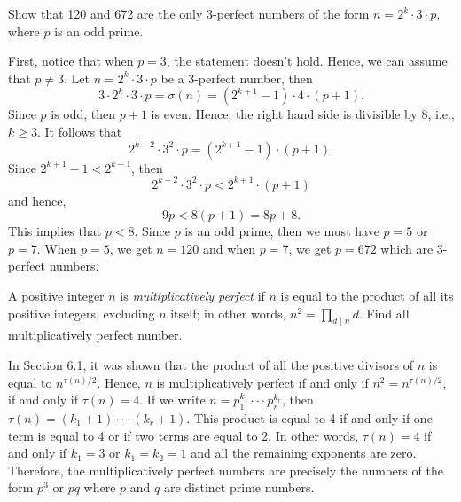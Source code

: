 \begin{exercise}
    Show that 120 and 672 are the only 3-perfect numbers of the form $n = 2^k\cdot 3 \cdot p$, where $p$ is an odd prime. \\
\end{exercise}

\begin{solution}
    First, notice that when $p = 3$, the statement doesn't hold. Hence, we can assume that $p \neq 3$. Let $n = 2^k \cdot 3 \cdot p$ be a 3-perfect number, then
    $$3\cdot 2^k\cdot 3 \cdot p = \sigma(n) = (2^{k+1} - 1)\cdot 4 \cdot (p+1).$$ 
    Since $p$ is odd, then $p+1$ is even. Hence, the right hand side is divisible by 8, i.e., $k \geq 3$. It follows that 
    $$2^{k-2}\cdot 3^2 \cdot p = (2^{k+1} - 1) \cdot (p+1).$$
    Since $2^{k+1} - 1 < 2^{k+1}$, then
    $$2^{k-2}\cdot 3^2 \cdot p < 2^{k+1}\cdot (p+1)$$
    and hence,
    $$9p < 8(p+1) = 8p + 8.$$
    This implies that $p < 8$. Since $p$ is an odd prime, then we must have $p = 5$ or $p = 7$. When $p = 5$, we get $n = 120$ and when $p = 7$, we get $p = 672$ which are 3-perfect numbers. \\
\end{solution}

\begin{exercise}
    A positive integer $n$ is \textit{multiplicatively perfect} if $n$ is equal to the product of all its positive integers, excluding $n$ itself; in other words, $n^2 = \prod_{d \mid n}d$. Find all multiplicatively perfect number.  \\
\end{exercise}

\begin{solution}
    In Section 6.1, it was shown that the product of all the positive divisors of $n$ is equal to $n^{\tau(n)/2}$. Hence, $n$ is multiplicatively perfect if and only if $n^2 = n^{\tau(n)/2}$, if and only if $\tau(n) = 4$. If we write $n = p_1^{k_1}\cdot \cdot \cdot p_r^{k_r}$, then $\tau(n) = (k_1 + 1)\cdot \cdot \cdot (k_r + 1)$. This product is equal to 4 if and only if one term is equal to 4 or if two terms are equal to 2. In other words, $\tau(n) = 4$ if and only if $k_1 = 3$ or $k_1 = k_2 = 1$ and all the remaining exponents are zero. Therefore, the multiplicatively perfect numbers are precisely the numbers of the form $p^3$ or $pq$ where $p$ and $q$ are distinct prime numbers.  \\
\end{solution}

